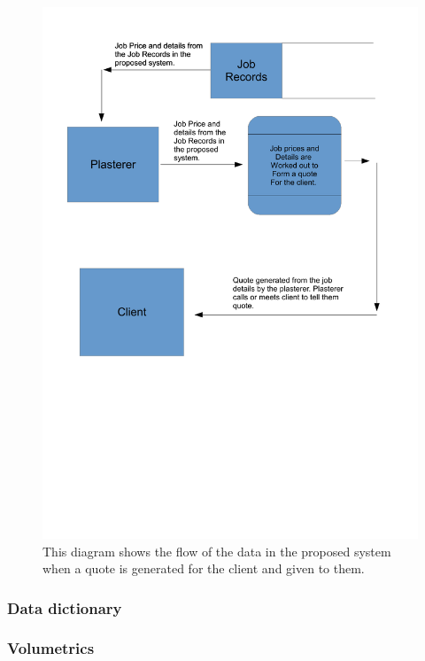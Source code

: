\begin{figure}[H]
\includegraphics[width=\textwidth]{./Analysis/images/proposedSystemGeneratingQuoteForClient.pdf}
    \caption{This diagram shows the flow of the data in the proposed system when a quote is generated for the client and given to them.} \label{fig:proposed_system_dfd_5}
\end{figure}




\subsubsection{Data dictionary}





\subsubsection{Volumetrics}

